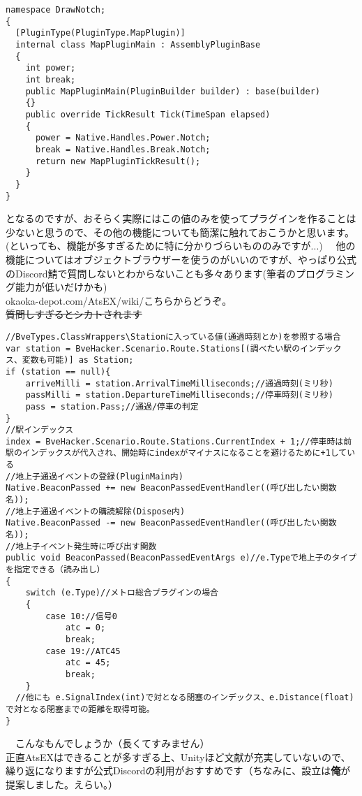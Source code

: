 \documentclass[b5paper,9pt,platex,dvipdfmx]{jsarticle}
\begin{document}
\begin{multicols*}{3}
\begin{lstlisting}[caption= MapPlugin.cs]
namespace DrawNotch;
{
  [PluginType(PluginType.MapPlugin)]
  internal class MapPluginMain : AssemblyPluginBase
  {
    int power;
    int break;
    public MapPluginMain(PluginBuilder builder) : base(builder)
    {}
    public override TickResult Tick(TimeSpan elapsed)
    {
      power = Native.Handles.Power.Notch;
      break = Native.Handles.Break.Notch;
      return new MapPluginTickResult();
    }
  }
}
\end{lstlisting}
となるのですが、おそらく実際にはこの値のみを使ってプラグインを作ることは少ないと思うので、その他の機能についても簡潔に触れておこうかと思います。\\
(といっても、機能が多すぎるために特に分かりづらいもののみですが...)
　他の機能についてはオブジェクトブラウザーを使うのがいいのですが、やっぱり公式のDiscord鯖で質問しないとわからないことも多々あります(筆者のプログラミング能力が低いだけかも)\\
okaoka-depot.com/AtsEX/wiki/こちらからどうぞ。\\
\sout{質問しすぎるとシカトされます}\\
\begin{lstlisting}[caption= 機能リスト]
//BveTypes.ClassWrappers\Stationに入っている値(通過時刻とか)を参照する場合
var station = BveHacker.Scenario.Route.Stations[(調べたい駅のインデックス、変数も可能)] as Station;
if (station == null){
    arriveMilli = station.ArrivalTimeMilliseconds;//通過時刻(ミリ秒)
    passMilli = station.DepartureTimeMilliseconds;//停車時刻(ミリ秒)
    pass = station.Pass;//通過/停車の判定
}
//駅インデックス
index = BveHacker.Scenario.Route.Stations.CurrentIndex + 1;//停車時は前駅のインデックスが代入され、開始時にindexがマイナスになることを避けるために+1している
//地上子通過イベントの登録(PluginMain内)
Native.BeaconPassed += new BeaconPassedEventHandler((呼び出したい関数名));
//地上子通過イベントの購読解除(Dispose内)
Native.BeaconPassed -= new BeaconPassedEventHandler((呼び出したい関数名));
//地上子イベント発生時に呼び出す関数
public void BeaconPassed(BeaconPassedEventArgs e)//e.Typeで地上子のタイプを指定できる（読み出し）
{
    switch (e.Type)//メトロ総合プラグインの場合
    {
        case 10://信号0
            atc = 0;
            break;
        case 19://ATC45
            atc = 45;
            break;
    }
  //他にも e.SignalIndex(int)で対となる閉塞のインデックス、e.Distance(float)で対となる閉塞までの距離を取得可能。
}
\end{lstlisting}
　こんなもんでしょうか（長くてすみません）\\
正直AtsEXはできることが多すぎる上、Unityほど文献が充実していないので、繰り返になりますが公式Discordの利用がおすすめです（ちなみに、設立は\textbf{俺}が提案しました。えらい。）\\

\end{multicols*}
\end{document}
